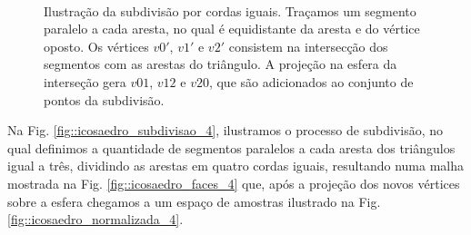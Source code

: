 \documentclass[
    12pt,                %
    oneside,            %
    a4paper,            %
    english,            %
    french,                %
    spanish,            %
    brazil                %
    ]{abntex2}
\begin{document}
\begin{figure}[htb]
    \centering
    \\
    \caption{ Ilustração da subdivisão por cordas iguais. Traçamos um segmento paralelo a cada aresta, no qual é equidistante da aresta e do vértice oposto. Os vértices $v0'$, $v1'$ e $v2'$ consistem na intersecção dos segmentos com as arestas do triângulo. A projeção na esfera da interseção gera $v01$, $v12$ e $v20$, que são adicionados ao conjunto de pontos da subdivisão.
    }
    \label{fig::triangle_subdivisao}
\end{figure}

Na Fig. \ref{fig::icosaedro_subdivisao_4}, ilustramos o processo de subdivisão, no qual definimos a quantidade de segmentos paralelos a cada aresta dos triângulos igual a três, dividindo as arestas em quatro cordas iguais, resultando numa malha mostrada na Fig. \ref{fig::icosaedro_faces_4} que, após a projeção dos novos vértices sobre a esfera chegamos a um espaço de amostras ilustrado na Fig. \ref{fig::icosaedro_normalizada_4}.
\end{document}
